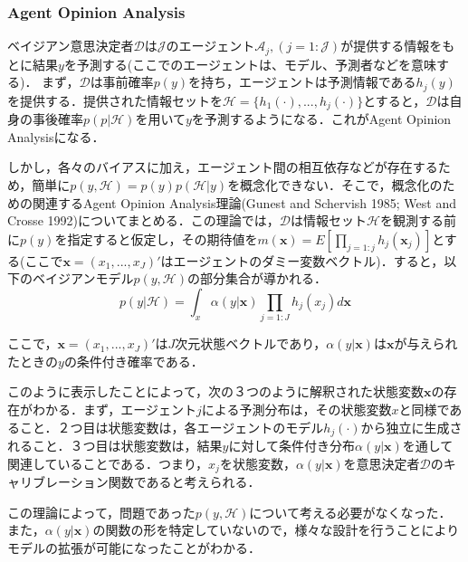 \documentclass[11pt,a4paper]{article}
\begin{document}
\subsubsection{Agent Opinion Analysis}
ベイジアン意思決定者$\mathcal{D}$は$\mathcal{J}$のエージェント$\mathcal{A}_j,(j = 1:\mathcal{J})$が提供する情報をもとに結果$y$を予測する(ここでのエージェントは、モデル、予測者などを意味する)．
まず，$\mathcal{D}$は事前確率$p(y)$を持ち，エージェントは予測情報である$h_j(y)$を提供する．提供された情報セットを$\mathcal{H} = \{h_1(\cdot),...,h_j(\cdot)\}$とすると，$\mathcal{D}$は自身の事後確率$p(p|\mathcal{H})$を用いて$y$を予測するようになる．これがAgent Opinion Analysisになる．\par
しかし，各々のバイアスに加え，エージェント間の相互依存などが存在するため，簡単に$p(y,\mathcal{H})=p(y)p(\mathcal{H}|y)$を概念化できない．そこで，概念化のための関連するAgent Opinion Analysis理論(Gunest and Schervish 1985; West and Crosse 1992)についてまとめる．この理論では，$\mathcal{D}$は情報セット$\mathcal{H}$を観測する前に$p(y)$を指定すると仮定し，その期待値を$m({\bm x}) = E[\prod_{j=1:j}h_j({\bm x}_j)]$とする(ここで${\bm x} = (x_1,...,x_J)'$はエージェントのダミー変数ベクトル)．すると，以下のベイジアンモデル$p(y,\mathcal{H})$の部分集合が導かれる．
\begin{equation}
p(y|\mathcal{H}) = \int_x \alpha(y|{\bm x}) \prod_{j=1:J} h_j(x_j)d\bm x
\label{ons1}
\end{equation}\par
ここで，${\bm x} = (x_1,...,x_J)'$は$J$次元状態ベクトルであり，$\alpha (y|\bm x)$は$\bm x$が与えられたときの$y$の条件付き確率である．\par
このように表示したことによって，次の３つのように解釈された状態変数${\bm x}$の存在がわかる．まず，エージェント$j$による予測分布は，その状態変数$x$と同様であること．２つ目は状態変数は，各エージェントのモデル$h_j(\cdot)$から独立に生成されること．３つ目は状態変数は，結果$y$に対して条件付き分布$\alpha(y|{\bm x})$を通して関連していることである．つまり，$x_j$を状態変数，$\alpha(y|{\bm x})$を意思決定者$\mathcal{D}$のキャリブレーション関数であると考えられる．\par
この理論によって，問題であった$p(y,\mathcal{H})$について考える必要がなくなった．また，$\alpha(y|{\bm x})$の関数の形を特定していないので，様々な設計を行うことによりモデルの拡張が可能になったことがわかる．
\end{document}
